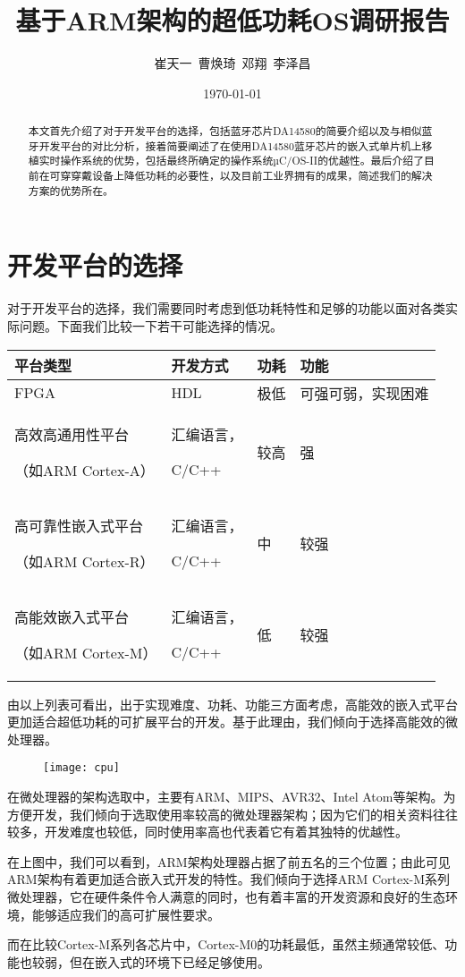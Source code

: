 \documentclass{ctexart}
\begin{document}
\title{基于ARM架构的超低功耗OS调研报告}
\author{崔天一\ 曹焕琦\ 邓翔\ 李泽昌}
\date{\today}
\begin{abstract}
本文首先介绍了对于开发平台的选择，包括蓝牙芯片DA14580的简要介绍以及与相似蓝牙开发平台的对比分析，接着简要阐述了在使用DA14580蓝牙芯片的嵌入式单片机上移植实时操作系统的优势，包括最终所确定的操作系统µC/OS-II的优越性。最后介绍了目前在可穿穿戴设备上降低功耗的必要性，以及目前工业界拥有的成果，简述我们的解决方案的优势所在。
\end{abstract}

\maketitle

\tableofcontents
\newpage
\section{开发平台的选择}

对于开发平台的选择，我们需要同时考虑到低功耗特性和足够的功能以面对各类实际问题。下面我们比较一下若干可能选择的情况。
\begin{center}
\begin{tabular}{| m{10em} | m{5em} | m{2em} | m{9em} |}
\hline
平台类型 & 开发方式 & 功耗 & 功能 \\
\hline
FPGA & HDL & 极低 & 可强可弱，实现困难 \\
\hline
高效高通用性平台\par（如ARM Cortex-A） & 汇编语言，\par C/C++ & 较高 & 强 \\
\hline
高可靠性嵌入式平台\par（如ARM Cortex-R） & 汇编语言，\par C/C++ & 中 & 较强 \\
\hline
高能效嵌入式平台\par（如ARM Cortex-M） & 汇编语言，\par C/C++ & 低 & 较强 \\
\hline
\end{tabular}
\end{center}
由以上列表可看出，出于实现难度、功耗、功能三方面考虑，高能效的嵌入式平台更加适合超低功耗的可扩展平台的开发。基于此理由，我们倾向于选择高能效的微处理器。\par
\begin{figure}[h]
\centering
\texttt{[image: cpu]}\par
\end{figure}
在微处理器的架构选取中，主要有ARM、MIPS、AVR32、Intel Atom等架构。为方便开发，我们倾向于选取使用率较高的微处理器架构；因为它们的相关资料往往较多，开发难度也较低，同时使用率高也代表着它有着其独特的优越性。\par
在上图中，我们可以看到，ARM架构处理器占据了前五名的三个位置；由此可见ARM架构有着更加适合嵌入式开发的特性。我们倾向于选择ARM Cortex-M系列微处理器，它在硬件条件令人满意的同时，也有着丰富的开发资源和良好的生态环境，能够适应我们的高可扩展性要求。\par
而在比较Cortex-M系列各芯片中，Cortex-M0的功耗最低，虽然主频通常较低、功能也较弱，但在嵌入式的环境下已经足够使用。
\end{document}
